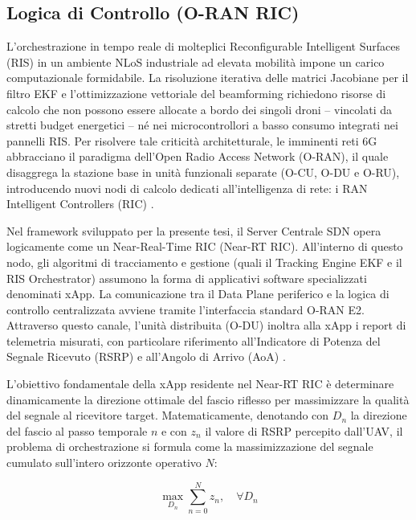 \documentclass[twoside]{article}
\begin{document}
\subsection{Logica di Controllo (O-RAN RIC)}

L'orchestrazione in tempo reale di molteplici Reconfigurable Intelligent Surfaces (RIS) in un ambiente NLoS industriale ad elevata mobilità impone un carico computazionale formidabile. La risoluzione iterativa delle matrici Jacobiane per il filtro EKF e l'ottimizzazione vettoriale del beamforming richiedono risorse di calcolo che non possono essere allocate a bordo dei singoli droni -- vincolati da stretti budget energetici -- né nei microcontrollori a basso consumo integrati nei pannelli RIS. Per risolvere tale criticità architetturale, le imminenti reti 6G abbracciano il paradigma dell'Open Radio Access Network (O-RAN), il quale disaggrega la stazione base in unità funzionali separate (O-CU, O-DU e O-RU), introducendo nuovi nodi di calcolo dedicati all'intelligenza di rete: i RAN Intelligent Controllers (RIC) \cite{Lien2024}.

Nel framework sviluppato per la presente tesi, il Server Centrale SDN opera logicamente come un Near-Real-Time RIC (Near-RT RIC). All'interno di questo nodo, gli algoritmi di tracciamento e gestione (quali il Tracking Engine EKF e il RIS Orchestrator) assumono la forma di applicativi software specializzati denominati xApp. La comunicazione tra il Data Plane periferico e la logica di controllo centralizzata avviene tramite l'interfaccia standard O-RAN E2. Attraverso questo canale, l'unità distribuita (O-DU) inoltra alla xApp i report di telemetria misurati, con particolare riferimento all'Indicatore di Potenza del Segnale Ricevuto (RSRP) e all'Angolo di Arrivo (AoA) \cite{Lien2024}.

L'obiettivo fondamentale della xApp residente nel Near-RT RIC è determinare dinamicamente la direzione ottimale del fascio riflesso per massimizzare la qualità del segnale al ricevitore target. Matematicamente, denotando con $D_n$ la direzione del fascio al passo temporale $n$ e con $z_n$ il valore di RSRP percepito dall'UAV, il problema di orchestrazione si formula come la massimizzazione del segnale cumulato sull'intero orizzonte operativo $N$:

\begin{equation}
\max_{D_n} \sum_{n=0}^{N} z_n, \quad \forall D_n
\label{eq:ric_objective}
\end{equation}
\end{document}
